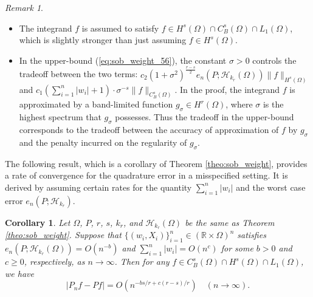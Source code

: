 \documentclass[11pt]{article}
\newtheorem{corollary}[theorem]{Corollary}
\theoremstyle{remark}
\newtheorem{remark}{Remark}
\theoremstyle{example}
\theoremstyle{remark}
\renewcommand{\H}{{\mathcal{H}}}
\newcommand{\R}{\mathbb{R}}
\begin{document}
\begin{remark} 
\begin{itemize}
\item The integrand $f$ is assumed to satisfy $f \in  H^s(\Omega) \cap C_B^s(\Omega) \cap L_1(\Omega)$, which is slightly stronger than just assuming $f \in H^s(\Omega)$.\vspace{-1mm}

\item In the upper-bound (\ref{eq:sob_weight_56}), the constant $\sigma > 0$ controls the tradeoff between the two terms: $c_2 (1+\sigma^2)^{\frac{r-s}{2}}  e_n(P;\H_{k_r}(\Omega)) \| f \|_{H^s(\Omega)}$ and $c_1 \left( \sum_{i=1}^n |w_i| + 1 \right) \cdot \sigma^{-s} \| f \|_{C_B^s(\Omega)}$. In the proof, the integrand $f$ is approximated by a band-limited function $g_\sigma \in H^r(\Omega)$, where $\sigma$ is the highest spectrum that $g_\sigma$ possesses.
Thus the tradeoff in the upper-bound corresponds to the tradeoff between the accuracy of approximation of $f$ by $g_\sigma$ and the penalty incurred on the regularity of $g_\sigma$.%
%
\end{itemize}
\end{remark}

The following result, which is a corollary of Theorem \ref{theo:sob_weight}, provides a rate of convergence for the quadrature error in a misspecified setting.
It is derived by assuming certain rates for the quantity $\sum_{i=1}^n | w_i |$ and the worst case error $e_n(P;\H_{k_r})$.
\begin{corollary} \label{coro:rate_weight}
Let $\Omega$, $P$, $r$, $s$, $k_r$, and $\H_{k_r}(\Omega)$ be the same as Theorem \ref{theo:sob_weight}. 
%
Suppose that $\{ (w_i,X_i) \}_{i=1}^n\in (\R \times \Omega)^n$ satisfies $e_n(P;\H_{k_r}(\Omega)) = O(n^{-b})$ and  $\sum_{i=1}^n | w_i | = O(n^c)$ for some $b > 0$ and $c \geq 0$, respectively, as $n \to \infty$.
Then for any $f \in C_B^s (\Omega) \cap H^s (\Omega) \cap L_1(\Omega)$, we have
\begin{equation} \label{eq:rate_sobw}
| P_n f - P f | = O( n^{ - bs/r + c (r-s)/r  } ) \quad (n \to \infty).
\end{equation}
\end{corollary}
\end{document}
